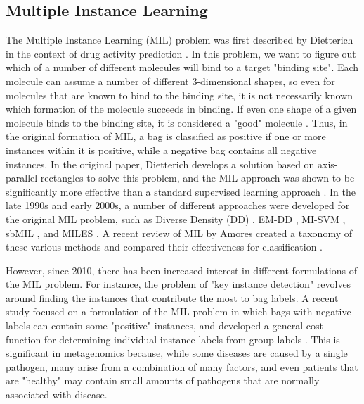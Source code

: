 
\subsection{Multiple Instance Learning}

The Multiple Instance Learning (MIL) problem was first described by Dietterich in the context of drug activity prediction \cite{dietterich97}. In this problem, we want to figure out which of a number of different molecules will bind to a target "binding site". Each molecule can assume a number of different 3-dimensional shapes, so even for molecules that are known to bind to the binding site, it is not necessarily known which formation of the molecule succeeds in binding. If even one shape of a given molecule binds to the binding site, it is considered a "good" molecule \cite{dietterich97}. Thus, in the original formation of MIL, a bag is classified as positive if one or more instances within it is positive, while a negative bag contains all negative instances. In the original paper, Dietterich develops a solution based on axis-parallel rectangles to solve this problem, and the MIL approach was shown to be significantly more effective than a standard supervised learning approach \cite{dietterich97}. In the late 1990s and early 2000s, a number of different approaches were developed for the original MIL problem, such as Diverse Density (DD) \cite{perez98}, EM-DD \cite{zhang01}, MI-SVM \cite{andrews02}, sbMIL \cite{bunescu07}, and MILES \cite{wang06}. A recent review of MIL by Amores created a taxonomy of these various methods and compared their effectiveness for classification \cite{amores13}.
%

However, since 2010, there has been increased interest in different formulations of the MIL problem. For instance, the problem of "key instance detection" \cite{zhou12} revolves around finding the instances that contribute the most to bag labels. A recent study focused on a formulation of the MIL problem in which bags with negative labels can contain some "positive" instances, and developed a general cost function for determining individual instance labels from group labels \cite{kotzias15}. This is significant in metagenomics because, while some diseases are caused by a single pathogen, many arise from a combination of many factors, and even patients that are "healthy" may contain small amounts of pathogens that are normally associated with disease. 
%

